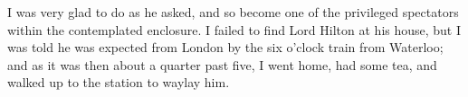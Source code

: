 I was very glad to do as he asked, and so become one of the privileged spectators within the contemplated enclosure. I failed to find Lord Hilton at his house, but I was told he was expected from London by the six o'clock train from Waterloo; and as it was then about a quarter past five, I went home, had some tea, and walked up to the station to waylay him.

